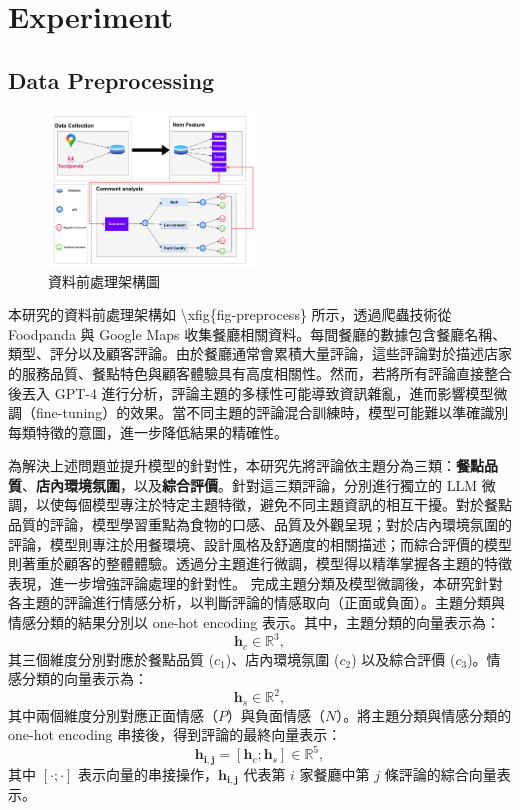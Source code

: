 \section{Experiment}
    \subsection{Data Preprocessing}
        \begin{figure}[tbh]
            \centering
            \includegraphics[width=0.5\textwidth]{img/preprocess.pdf}
            \caption{資料前處理架構圖}
            \label{fig-preprocess}
        \end{figure}
        本研究的資料前處理架構如 \textbackslash xfig\{fig-preprocess\} 所示，透過爬蟲技術從 Foodpanda 與 Google Maps 收集餐廳相關資料。每間餐廳的數據包含餐廳名稱、類型、評分以及顧客評論。由於餐廳通常會累積大量評論，這些評論對於描述店家的服務品質、餐點特色與顧客體驗具有高度相關性。然而，若將所有評論直接整合後丟入 GPT-4 進行分析，評論主題的多樣性可能導致資訊雜亂，進而影響模型微調（fine-tuning）的效果。當不同主題的評論混合訓練時，模型可能難以準確識別每類特徵的意圖，進一步降低結果的精確性。

        為解決上述問題並提升模型的針對性，本研究先將評論依主題分為三類：\textbf{餐點品質}、\textbf{店內環境氛圍}，以及\textbf{綜合評價}。針對這三類評論，分別進行獨立的 LLM 微調，以使每個模型專注於特定主題特徵，避免不同主題資訊的相互干擾。對於餐點品質的評論，模型學習重點為食物的口感、品質及外觀呈現；對於店內環境氛圍的評論，模型則專注於用餐環境、設計風格及舒適度的相關描述；而綜合評價的模型則著重於顧客的整體體驗。透過分主題進行微調，模型得以精準掌握各主題的特徵表現，進一步增強評論處理的針對性。
        \color{blue}
        完成主題分類及模型微調後，本研究針對各主題的評論進行情感分析，以判斷評論的情感取向（正面或負面）。主題分類與情感分類的結果分別以 one-hot encoding 表示。其中，主題分類的向量表示為：
        \begin{equation}
            \mathbf{h}_c \in \mathbb{R}^3,
        \end{equation}
        其三個維度分別對應於餐點品質 (\(c_1\))、店內環境氛圍 (\(c_2\)) 以及綜合評價 (\(c_3\))。情感分類的向量表示為：
        \begin{equation}
            \mathbf{h}_s \in \mathbb{R}^2,
        \end{equation}
        其中兩個維度分別對應正面情感（\(P\)）與負面情感（\(N\)）。將主題分類與情感分類的 one-hot encoding 串接後，得到評論的最終向量表示：
        \begin{equation}
            \mathbf{h_{i,j}} = [\mathbf{h}_c; \mathbf{h}_s] \in \mathbb{R}^5,
        \end{equation}
        其中 \([\cdot; \cdot]\) 表示向量的串接操作，\(\mathbf{h_{i,j}}\) 代表第 \(i\) 家餐廳中第 \(j\) 條評論的綜合向量表示。
        
